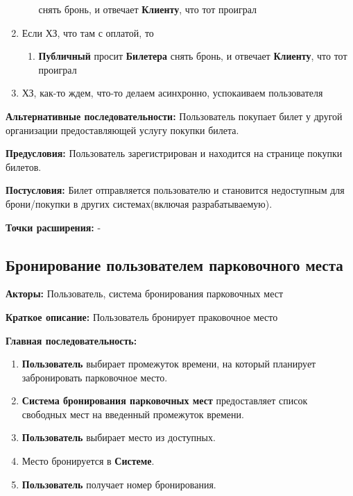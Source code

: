 \begin{enumerate}
\begin{enumerate}
                        снять бронь, и отвечает \textbf{Клиенту},
                        что тот проиграл
            \end{enumerate}
      \item Если ХЗ, что там с оплатой, то
            \begin{enumerate}
                  \item \textbf{Публичный} просит \textbf{Билетера}
                        снять бронь, и отвечает \textbf{Клиенту},
                        что тот проиграл
            \end{enumerate}
      \item ХЗ, как-то ждем, что-то делаем асинхронно,
            успокаиваем пользователя
\end{enumerate}

\textbf{Альтернативные последовательности:} Пользователь покупает билет у другой организации предоставляющей
услугу покупки билета.

\textbf{Предусловия:} Пользователь зарегистрирован и находится на странице покупки билетов.

\textbf{Постусловия:} Билет отправляется пользователю и становится недоступным для брони/покупки в других системах(включая разрабатываемую).

\textbf{Точки расширения:} -




\subsection{Бронирование пользователем парковочного места}

\textbf{Акторы:} Пользователь, система бронирования парковочных мест

\textbf{Краткое описание:} Пользователь бронирует праковочное место

\textbf{Главная последовательность:} 
\begin{enumerate}
      \item \textbf{Пользователь} выбирает промежуток времени, на который планирует забронировать парковочное место. 
      \item \textbf{Система бронирования парковочных мест} предоставляет список свободных мест на введенный промежуток времени.
      \item \textbf{Пользователь} выбирает место из доступных.
      \item Место бронируется в \textbf{Системе}.
      \item \textbf{Пользователь} получает номер бронирования.
\end{enumerate}

